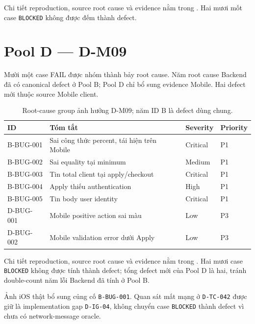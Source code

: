 Chi tiết reproduction, source root cause và evidence nằm trong
. Hai mươi mốt case \texttt{BLOCKED} không được
đếm thành defect.

\section{Pool D --- D-M09}

Mười một case FAIL được nhóm thành bảy root cause. Năm root cause Backend đã có
canonical defect ở Pool B; Pool D chỉ bổ sung evidence Mobile. Hai defect mới
thuộc source Mobile client.

\begin{table}[H]
  \centering
  \small
  \begin{tabular}{p{}p{}p{}p{}}
    \toprule
    ID & Tóm tắt & Severity & Priority \\
    \midrule
    B-BUG-001 & Sai công thức percent, tái hiện trên Mobile & Critical & P1 \\
    B-BUG-002 & Sai equality tại minimum & Medium & P1 \\
    B-BUG-003 & Tin total client tại apply/checkout & Critical & P1 \\
    B-BUG-004 & Apply thiếu authentication & High & P1 \\
    B-BUG-005 & Tin body user identity & Critical & P1 \\
    D-BUG-001 & Mobile positive action sai màu & Low & P3 \\
    D-BUG-002 & Mobile validation error dưới Apply & Low & P3 \\
    \bottomrule
  \end{tabular}
  \caption{Root-cause group ảnh hưởng D-M09; năm ID B là defect dùng chung.}
\end{table}

Chi tiết reproduction, source root cause và evidence nằm trong
. Hai mươi case \texttt{BLOCKED} không được tính
thành defect; tổng defect mới của Pool D là hai, tránh double-count năm lỗi
Backend đã tính ở Pool B.

Ảnh iOS thật bổ sung củng cố \texttt{B-BUG-001}. Quan sát mất mạng ở
\texttt{D-TC-042} được giữ là implementation gap \texttt{D-IG-04}, không chuyển
case \texttt{BLOCKED} thành defect vì chưa có network-message oracle.
